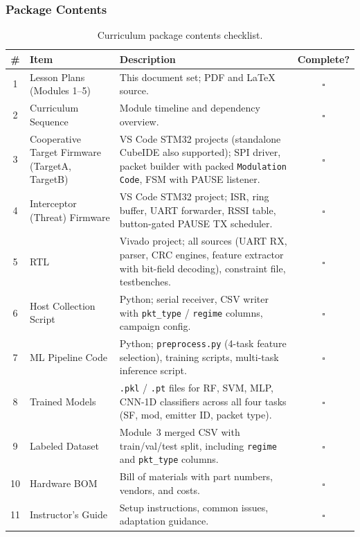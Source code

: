 \documentclass[11pt,letterpaper]{article}
\begin{document}
	\subsubsection{Package Contents}

	\begin{table}[ht!]
		\centering
		\caption{Curriculum package contents checklist.}
		\label{tab:package}
		\renewcommand{\arraystretch}{1.3}
		\begin{tabularx}{\textwidth}{c l X c}
			\toprule
			\textbf{\#} & \textbf{Item} & \textbf{Description} & \textbf{Complete?} \\
			\midrule
			1 & Lesson Plans (Modules 1--5) & This document set; PDF and \LaTeX{} source. & $\square$ \\
			2 & Curriculum Sequence & Module timeline and dependency overview. & $\square$ \\
			3 & Cooperative Target Firmware (TargetA, TargetB) & VS Code STM32 projects (standalone CubeIDE also supported); SPI driver, packet builder with packed \texttt{Modulation Code}, FSM with PAUSE listener. & $\square$ \\
			4 & Interceptor (Threat) Firmware & VS Code STM32 project; ISR, ring buffer, UART forwarder, RSSI table, button-gated PAUSE TX scheduler. & $\square$ \\
			5 & \FPGA{} RTL & Vivado project; all \VHDL{} sources (UART RX, parser, CRC engines, feature extractor with bit-field decoding), constraint file, testbenches. & $\square$ \\
			6 & Host Collection Script & Python; serial receiver, CSV writer with \texttt{pkt\_type} / \texttt{regime} columns, campaign config. & $\square$ \\
			7 & ML Pipeline Code & Python; \texttt{preprocess.py} (4-task feature selection), training scripts, multi-task inference script. & $\square$ \\
			8 & Trained Models & \texttt{.pkl} / \texttt{.pt} files for RF, SVM, MLP, CNN-1D classifiers across all four tasks (SF, mod, emitter ID, packet type). & $\square$ \\
			9 & Labeled Dataset & Module~3 merged CSV with train/val/test split, including \texttt{regime} and \texttt{pkt\_type} columns. & $\square$ \\
			10 & Hardware BOM & Bill of materials with part numbers, vendors, and costs. & $\square$ \\
			11 & Instructor's Guide & Setup instructions, common issues, adaptation guidance. & $\square$ \\
			\bottomrule
		\end{tabularx}
	\end{table}
\end{document}
